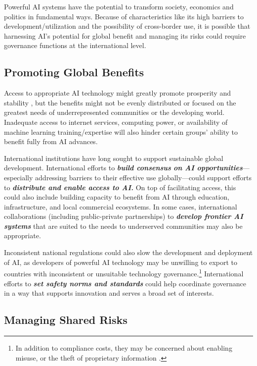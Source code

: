 \documentclass[12pt]{article}
\begin{document}
Powerful AI systems have the potential to transform society, economics
and politics in fundamental ways. Because of characteristics like its
high barriers to development/utilization and the possibility of
cross-border use, it is possible that harnessing AI's potential for
global benefit and managing its risks could require governance functions
at the international level.

\subsection{Promoting Global Benefits}

Access to appropriate AI technology might greatly promote prosperity and
stability \cite{vinuesa_role_2020},
but the benefits might not be evenly distributed or focused on 
the greatest needs of underrepresented communities or
the developing world. Inadequate access to internet services, computing
power, or availability of machine learning training/expertise will also
hinder certain groups' ability to benefit fully from AI advances.

International institutions have long sought to support sustainable
global development. International efforts to \emph{\textbf{build
consensus} \textbf{on AI opportunities}}---especially addressing
barriers to their effective use globally---could support efforts to
\emph{\textbf{distribute and enable access to AI.}} On top of
facilitating access, this could also include building capacity to benefit from AI 
through
education, infrastructure, and local commercial ecosystems. In some
cases, international collaborations (including public-private
partnerships) to \emph{\textbf{develop frontier AI systems}} that are
suited to the needs to underserved communities may also be appropriate.

Inconsistent national regulations could also slow the development and
deployment of AI, as developers of powerful AI technology may be unwilling
to export to countries with inconsistent or unsuitable technology
governance.\footnote{In addition to compliance costs, 
they may be concerned about enabling
misuse, or the theft of proprietary information \cite{awokuse_stronger_2010}.}
International efforts to \emph{\textbf{set safety norms and standards}}
could help coordinate governance in a way that supports innovation and
serves a broad set of interests.

\subsection{Managing Shared Risks}
\end{document}
